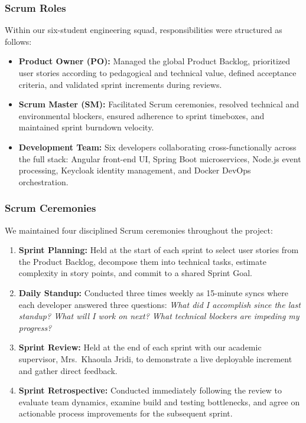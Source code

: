 \subsubsection{Scrum Roles}
Within our six-student engineering squad, responsibilities were structured as follows:
\begin{itemize}[leftmargin=1.5em]
    \item \textbf{Product Owner (PO):} Managed the global Product Backlog, prioritized user stories according to pedagogical and technical value, defined acceptance criteria, and validated sprint increments during reviews.
    \item \textbf{Scrum Master (SM):} Facilitated Scrum ceremonies, resolved technical and environmental blockers, ensured adherence to sprint timeboxes, and maintained sprint burndown velocity.
    \item \textbf{Development Team:} Six developers collaborating cross-functionally across the full stack: Angular front-end UI, Spring Boot microservices, Node.js event processing, Keycloak identity management, and Docker DevOps orchestration.
\end{itemize}

\subsubsection{Scrum Ceremonies}
We maintained four disciplined Scrum ceremonies throughout the project:
\begin{enumerate}[leftmargin=1.5em]
    \item \textbf{Sprint Planning:} Held at the start of each sprint to select user stories from the Product Backlog, decompose them into technical tasks, estimate complexity in story points, and commit to a shared Sprint Goal.
    \item \textbf{Daily Standup:} Conducted three times weekly as 15-minute syncs where each developer answered three questions: \textit{What did I accomplish since the last standup? What will I work on next? What technical blockers are impeding my progress?}
    \item \textbf{Sprint Review:} Held at the end of each sprint with our academic supervisor, Mrs.~Khaoula Jridi, to demonstrate a live deployable increment and gather direct feedback.
    \item \textbf{Sprint Retrospective:} Conducted immediately following the review to evaluate team dynamics, examine build and testing bottlenecks, and agree on actionable process improvements for the subsequent sprint.
\end{enumerate}

